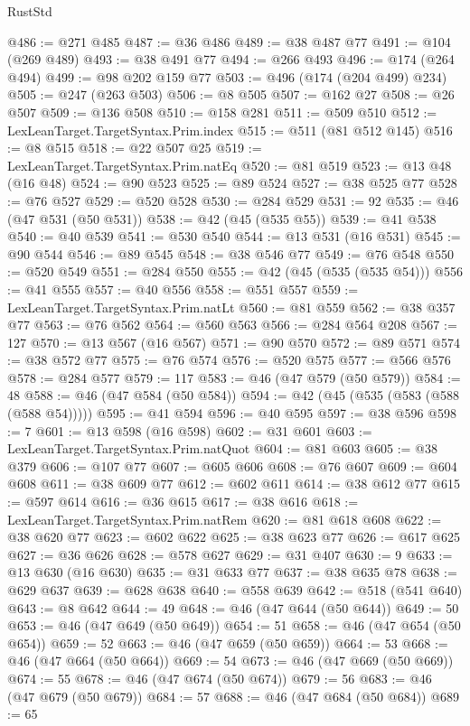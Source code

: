 \begin{lexlean}{RustStd}
\begin{coremodule}
@486 := @271 @485
@487 := @36 @486
@489 := @38 @487 @77
@491 := @104 (@269 @489)
@493 := @38 @491 @77
@494 := @266 @493
@496 := @174 (@264 @494)
@499 := @98 @202 @159 @77
@503 := @496 (@174 (@204 @499) @234)
@505 := @247 (@263 @503)
@506 := @8 @505
@507 := @162 @27
@508 := @26 @507
@509 := @136 @508
@510 := @158 @281
@511 := @509 @510
@512 := LexLeanTarget.TargetSyntax.Prim.index
@515 := @511 (@81 @512 @145)
@516 := @8 @515
@518 := @22 @507 @25
@519 := LexLeanTarget.TargetSyntax.Prim.natEq
@520 := @81 @519
@523 := @13 @48 (@16 @48)
@524 := @90 @523
@525 := @89 @524
@527 := @38 @525 @77
@528 := @76 @527
@529 := @520 @528
@530 := @284 @529
@531 := 92
@535 := @46 (@47 @531 (@50 @531))
@538 := @42 (@45 (@535 @55))
@539 := @41 @538
@540 := @40 @539
@541 := @530 @540
@544 := @13 @531 (@16 @531)
@545 := @90 @544
@546 := @89 @545
@548 := @38 @546 @77
@549 := @76 @548
@550 := @520 @549
@551 := @284 @550
@555 := @42 (@45 (@535 (@535 @54)))
@556 := @41 @555
@557 := @40 @556
@558 := @551 @557
@559 := LexLeanTarget.TargetSyntax.Prim.natLt
@560 := @81 @559
@562 := @38 @357 @77
@563 := @76 @562
@564 := @560 @563
@566 := @284 @564 @208
@567 := 127
@570 := @13 @567 (@16 @567)
@571 := @90 @570
@572 := @89 @571
@574 := @38 @572 @77
@575 := @76 @574
@576 := @520 @575
@577 := @566 @576
@578 := @284 @577
@579 := 117
@583 := @46 (@47 @579 (@50 @579))
@584 := 48
@588 := @46 (@47 @584 (@50 @584))
@594 := @42 (@45 (@535 (@583 (@588 (@588 @54)))))
@595 := @41 @594
@596 := @40 @595
@597 := @38 @596
@598 := 7
@601 := @13 @598 (@16 @598)
@602 := @31 @601
@603 := LexLeanTarget.TargetSyntax.Prim.natQuot
@604 := @81 @603
@605 := @38 @379
@606 := @107 @77
@607 := @605 @606
@608 := @76 @607
@609 := @604 @608
@611 := @38 @609 @77
@612 := @602 @611
@614 := @38 @612 @77
@615 := @597 @614
@616 := @36 @615
@617 := @38 @616
@618 := LexLeanTarget.TargetSyntax.Prim.natRem
@620 := @81 @618 @608
@622 := @38 @620 @77
@623 := @602 @622
@625 := @38 @623 @77
@626 := @617 @625
@627 := @36 @626
@628 := @578 @627
@629 := @31 @407
@630 := 9
@633 := @13 @630 (@16 @630)
@635 := @31 @633 @77
@637 := @38 @635 @78
@638 := @629 @637
@639 := @628 @638
@640 := @558 @639
@642 := @518 (@541 @640)
@643 := @8 @642
@644 := 49
@648 := @46 (@47 @644 (@50 @644))
@649 := 50
@653 := @46 (@47 @649 (@50 @649))
@654 := 51
@658 := @46 (@47 @654 (@50 @654))
@659 := 52
@663 := @46 (@47 @659 (@50 @659))
@664 := 53
@668 := @46 (@47 @664 (@50 @664))
@669 := 54
@673 := @46 (@47 @669 (@50 @669))
@674 := 55
@678 := @46 (@47 @674 (@50 @674))
@679 := 56
@683 := @46 (@47 @679 (@50 @679))
@684 := 57
@688 := @46 (@47 @684 (@50 @684))
@689 := 65

\end{coremodule}
\end{lexlean}
